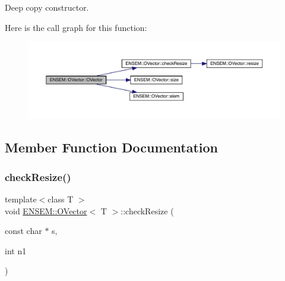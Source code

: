 Deep copy constructor. 

Here is the call graph for this function\+:
\nopagebreak
\begin{figure}[H]
\begin{center}
\leavevmode
\includegraphics[width=350pt]{d0/d8d/classENSEM_1_1OVector_a10129359c78668211e551f3b13829208_cgraph}
\end{center}
\end{figure}


\subsection{Member Function Documentation}
\mbox{\label{classENSEM_1_1OVector_a95545451bb9d6be83ba32ad3dc2dab42}} 
\subsubsection{\texorpdfstring{checkResize()}{checkResize()}\hspace{0.1cm}{\footnotesize\ttfamily [1/6]}}
{\footnotesize\ttfamily template$<$class T $>$ \\
void \mbox{\hyperlink{classENSEM_1_1OVector}{E\+N\+S\+E\+M\+::\+O\+Vector}}$<$ T $>$\+::check\+Resize (\begin{DoxyParamCaption}\item[{const char $\ast$}]{s,  }\item[{int}]{n1 }\end{DoxyParamCaption})\hspace{0.3cm}{\ttfamily [inline]}}

